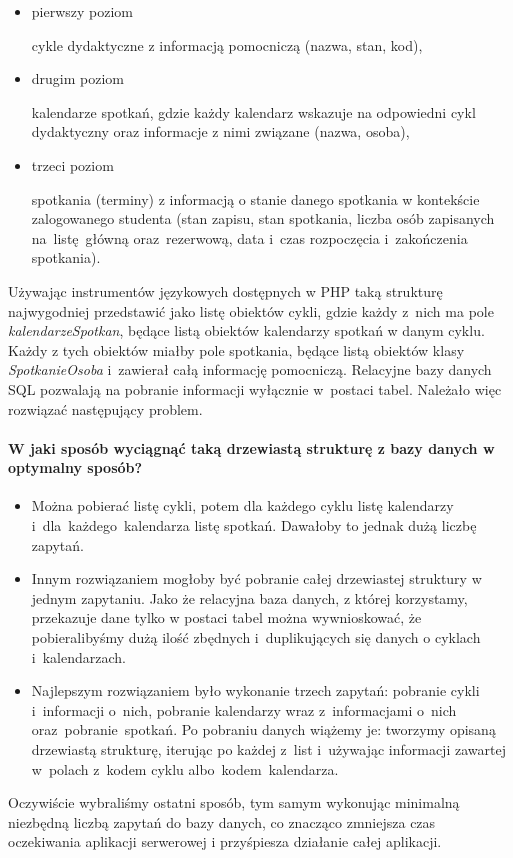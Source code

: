 \documentclass[licencjacka]{pracamgr}
\begin{document}
\begin{itemize}
\item{pierwszy poziom}

cykle dydaktyczne z informacją pomocniczą (nazwa, stan, kod),
\item{drugim poziom}

kalendarze spotkań, gdzie każdy kalendarz wskazuje na odpowiedni cykl dydaktyczny oraz informacje z nimi związane (nazwa, osoba),
\item{trzeci poziom}

spotkania (terminy) z informacją o stanie danego spotkania w kontekście zalogowanego studenta (stan zapisu, stan spotkania, liczba osób zapisanych na~listę~główną oraz~rezerwową, data i~czas rozpoczęcia i~zakończenia spotkania).
\end{itemize}

Używając instrumentów językowych dostępnych w PHP taką strukturę najwygodniej przedstawić jako listę obiektów cykli, gdzie każdy z~nich ma pole \textsl{kalendarzeSpotkan}, będące listą obiektów kalendarzy spotkań w danym cyklu. Każdy z tych obiektów miałby pole spotkania, będące listą obiektów klasy \textsl{SpotkanieOsoba} i~zawierał całą informację pomocniczą. Relacyjne bazy danych SQL pozwalają na pobranie informacji wyłącznie w~postaci tabel. Należało więc rozwiązać następujący problem.



\newpage
\paragraph{W jaki sposób wyciągnąć taką drzewiastą strukturę z bazy danych w optymalny sposób?}
\begin{itemize}
  \item
  Można pobierać listę cykli, potem dla każdego cyklu listę kalendarzy i~dla~każdego~kalendarza listę spotkań. Dawałoby to jednak dużą liczbę zapytań.
  \item
  Innym rozwiązaniem mogłoby być pobranie całej drzewiastej struktury w jednym zapytaniu. Jako że relacyjna baza danych, z której korzystamy, przekazuje dane tylko w postaci tabel można wywnioskować, że pobieralibyśmy dużą ilość zbędnych i~duplikujących się danych o cyklach i~kalendarzach.
  \item
  Najlepszym rozwiązaniem było wykonanie trzech zapytań: pobranie cykli i~informacji o~nich, pobranie kalendarzy wraz z~informacjami o~nich oraz~pobranie~spotkań. Po pobraniu danych wiążemy je: tworzymy opisaną drzewiastą strukturę, iterując po każdej z~list i~używając informacji zawartej w~polach z~kodem cyklu albo~kodem~kalendarza.
\end{itemize}
Oczywiście wybraliśmy ostatni sposób, tym samym wykonując minimalną niezbędną liczbą zapytań do bazy danych, co znacząco zmniejsza czas oczekiwania aplikacji serwerowej i przyśpiesza działanie całej aplikacji.
\end{document}
